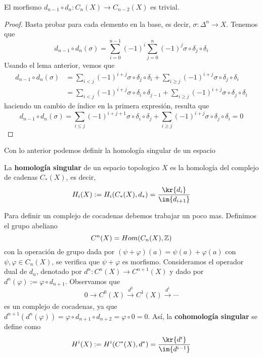 \documentclass{article}
\begin{document}
\begin{cor}
    El morfismo $d_{n-1}\circ d_{n}:C_{n}(X)\to C_{n-2}(X)$ es trivial.
\end{cor}
\begin{proof}
    Basta probar para cada elemento en la base, es decir, $\sigma:\Delta^{n}\to X$. Tenemos que
    \begin{equation*}
        d_{n-1}\circ d_{n}(\sigma)=\sum_{i=0}^{n-1}(-1)^{i}\sum_{j=0}^{n}(-1)^{j}
        \sigma\circ\delta_{j}\circ\delta_{i}
    \end{equation*}
    Usando el lema anterior, vemos que
    \begin{align*}
        d_{n-1}\circ d_{n}(\sigma) &= \sum_{i<j}(-1)^{i+j}\sigma\circ\delta_{j}\circ\delta_{i}
        +\sum_{i\geq j}(-1)^{i+j}\sigma\circ\delta_{j}\circ\delta_{i} \\
        &= \sum_{i<j}(-1)^{i+j}\sigma\circ\delta_{i}\circ\delta_{j-1}
        +\sum_{i\geq j}(-1)^{i+j}\sigma\circ\delta_{j}\circ\delta_{i}
    \end{align*}
    haciendo un cambio de índice en la primera expresión, resulta que
    \begin{equation*}
        d_{n-1}\circ d_{n}(\sigma)=\sum_{i\leq j}(-1)^{i+j+1}\sigma\circ\delta_{i}\circ\delta_{j}
        +\sum_{i\geq j}(-1)^{i+j}\sigma\circ\delta_{j}\circ\delta_{i}=0
    \end{equation*}
\end{proof}

\noindent Con lo anterior podemos definir la homología singular de un espacio

\begin{dfn}
    La \textbf{homología singular} de un espacio topologico $X$ es la homología del complejo de
    cadenas $C_{*}(X)$, es decir,
    \begin{equation*}
        H_{i}(X):=H_{i}(C_{*}(X),d_{*})=\frac{\kr{d_{i}}}{\im{d_{i+1}}}
    \end{equation*}
\end{dfn}

\noindent Para definir un complejo de cocadenas debemos trabajar un poco mas. Definimos el grupo 
abeliano
\begin{equation*}
    C^{n}(X)=Hom(C_{n}(X),\mathbb{Z})
\end{equation*}
con la operación de grupo dada por $(\psi+\varphi)(a)=\psi(a)+\varphi(a)$ con $\psi,\varphi\in 
C_{n}(X)$, se verifica que $\psi+\varphi$ es morfismo. Consideramos el operador dual de $d_{n}$,
denotado por $d^{n}:C^{n}(X)\to C^{n+1}(X)$ y dado por $d^{n}(\varphi):=\varphi\circ d_{n+1}$. 
Observamos que
\begin{equation*}
    0\xrightarrow[]{}C^{0}(X)\xrightarrow[]{d^{0}}C^{1}(X)\xrightarrow[]{d^{1}}\cdots
\end{equation*}
es un complejo de cocadenas, ya que $d^{n+1}(d^{n}(\varphi))=\varphi\circ d_{n+1}\circ d_{n+2}
=\varphi\circ0=0$. Así, la \textbf{cohomología singular} se define como
\begin{equation*}
    H^{i}(X):=H^{i}(C^{*}(X),d^{*})=\frac{\kr{d^{i}}}{\im{d^{i-1}}}
\end{equation*}
\end{document}
